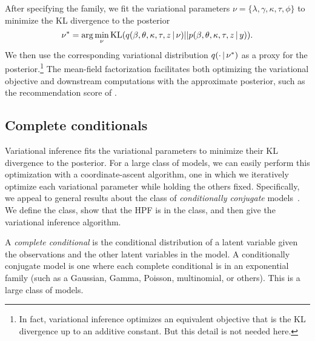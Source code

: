 After specifying the family, we fit the variational parameters $\nu =
\{\lambda, \gamma, \kappa, \tau, \phi\}$ to minimize the KL divergence to the
posterior
\begin{equation*}
  \nu^* = \arg \min_\nu \textrm{KL}(q(\beta,
  \theta, \kappa, \tau, z \,\vert\, \nu) || p(\beta, \theta, \kappa, \tau, z \,\vert\, y)).
\end{equation*}
We then use the corresponding variational distribution $q(\cdot \,\vert\,
\nu^*)$ as a proxy for the posterior.\footnote{In fact, variational inference
optimizes an equivalent objective that is the KL divergence up to an
additive constant.  But this detail is not needed here.}  The
mean-field factorization facilitates both optimizing the variational
objective and downstream computations with the approximate posterior,
such as the recommendation score of .

\subsection{Complete conditionals}

Variational inference fits the variational parameters to minimize
their KL divergence to the posterior.  For a large class of models, we
can easily perform this optimization with a coordinate-ascent
algorithm, one in which we iteratively optimize each variational
parameter while holding the others fixed.  Specifically, we appeal to
general results about the class of \textit{conditionally conjugate}
models~\cite{Ghahramani:2001,Hoffman:2013}.  We define the class, show
that the HPF is in the class, and then give the variational inference
algorithm.

A \textit{complete conditional} is the conditional distribution of a
latent variable given the observations and the other latent variables
in the model.  A conditionally conjugate model is one where each
complete conditional is in an exponential family (such as a Gaussian,
Gamma, Poisson, multinomial, or others).  This is a large class of
models.

